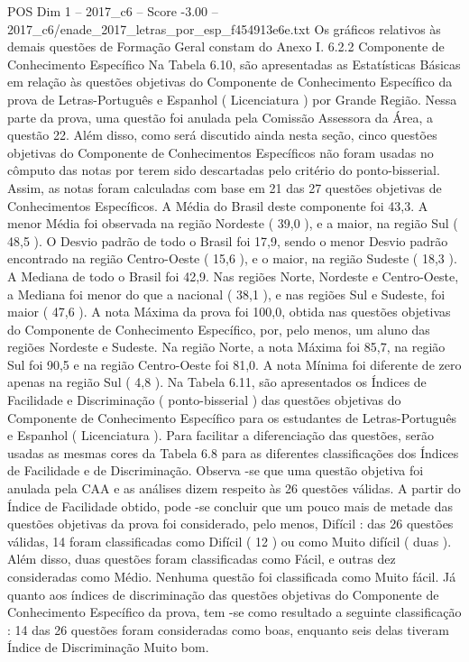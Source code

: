 \begin{textsample}{POS Dim 1 – 2017\_c6 – Score -3.00 – 2017\_c6/enade\_2017\_letras\_por\_esp\_f454913e6e.txt}
Os gráficos relativos às demais questões de Formação Geral constam do Anexo I. 6.2.2 Componente de Conhecimento Específico Na Tabela 6.10, são apresentadas as Estatísticas Básicas em relação às questões objetivas do Componente de Conhecimento Específico da prova de Letras-Português e Espanhol ( Licenciatura ) por Grande Região.
Nessa parte da prova, uma questão foi anulada pela Comissão Assessora da Área, a questão 22.
Além disso, como será discutido ainda nesta seção, cinco questões objetivas do Componente de Conhecimentos Específicos não foram usadas no cômputo das notas por terem sido descartadas pelo critério do ponto-bisserial.
Assim, as notas foram calculadas com base em 21 das 27 questões objetivas de Conhecimentos Específicos.
A Média do Brasil deste componente foi 43,3.
A menor Média foi observada na região Nordeste ( 39,0 ), e a maior, na região Sul ( 48,5 ).
O Desvio padrão de todo o Brasil foi 17,9, sendo o menor Desvio padrão encontrado na região Centro-Oeste ( 15,6 ), e o maior, na região Sudeste ( 18,3 ).
A Mediana de todo o Brasil foi 42,9.
Nas regiões Norte, Nordeste e Centro-Oeste, a Mediana foi menor do que a nacional ( 38,1 ), e nas regiões Sul e Sudeste, foi maior ( 47,6 ).
A nota Máxima da prova foi 100,0, obtida nas questões objetivas do Componente de Conhecimento Específico, por, pelo menos, um aluno das regiões Nordeste e Sudeste.
Na região Norte, a nota Máxima foi 85,7, na região Sul foi 90,5 e na região Centro-Oeste foi 81,0.
A nota Mínima foi diferente de zero apenas na região Sul ( 4,8 ).
Na Tabela 6.11, são apresentados os Índices de Facilidade e Discriminação ( ponto-bisserial ) das questões objetivas do Componente de Conhecimento Específico para os estudantes de Letras-Português e Espanhol ( Licenciatura ).
Para facilitar a diferenciação das questões, serão usadas as mesmas cores da Tabela 6.8 para as diferentes classificações dos Índices de Facilidade e de Discriminação.
Observa -se que uma questão objetiva foi anulada pela CAA e as análises dizem respeito às 26 questões válidas.
A partir do Índice de Facilidade obtido, pode -se concluir que um pouco mais de metade das questões objetivas da prova foi considerado, pelo menos, Difícil : das 26 questões válidas, 14 foram classificadas como Difícil ( 12 ) ou como Muito difícil ( duas ).
Além disso, duas questões foram classificadas como Fácil, e outras dez consideradas como Médio.
Nenhuma questão foi classificada como Muito fácil.
Já quanto aos índices de discriminação das questões objetivas do Componente de Conhecimento Específico da prova, tem -se como resultado a seguinte classificação : 14 das 26 questões foram consideradas como boas, enquanto seis delas tiveram Índice de Discriminação Muito bom.

\end{textsample}

